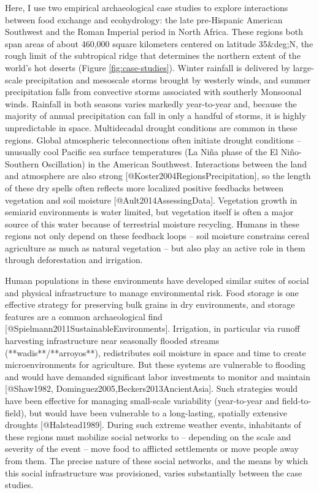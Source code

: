\documentclass[fleqn,10pt]{wlscirep}
\begin{document}
Here, I use two empirical archaeological case studies to explore interactions between food exchange and ecohydrology: the late pre-Hispanic American Southwest and the Roman Imperial period in North Africa. These regions both span areas of about 460,000 square kilometers centered on latitude 35&deg;N, the rough limit of the subtropical ridge that determines the northern extent of the world's hot deserts (Figure \ref{fig:case-studies}). Winter rainfall is delivered by large-scale precipitation and mesoscale storms brought by westerly winds, and summer precipitation falls from convective storms associated with southerly Monsoonal winds. Rainfall in both seasons varies markedly year-to-year and, because the majority of annual precipitation can fall in only a handful of storms, it is highly unpredictable in space. Multidecadal drought conditions are common in these regions. Global atmospheric teleconnections often initiate drought conditions -- unusually cool Pacific sea surface temperatures (La Ni\~{n}a phase of the El Ni\~{n}o-Southern Oscillation) in the American Southwest. Interactions between the land and atmosphere are also strong [@Koster2004RegionsPrecipitation], so the length of these dry spells often reflects more localized positive feedbacks between vegetation and soil moisture [@Ault2014AssessingData]. Vegetation growth in semiarid environments is water limited, but vegetation itself is often a major source of this  water because of terrestrial moisture recycling. Humans in these regions not only depend on these feedback loops -- soil moisture constrains cereal agriculture as much as natural vegetation -- but also play an active role in them through deforestation and irrigation.

Human populations in these environments have developed similar suites of social and physical infrastructure to manage environmental risk. Food storage is one effective strategy for preserving bulk grains in dry environments, and storage features are a common archaeological find [@Spielmann2011SustainableEnvironments]. Irrigation, in particular via runoff harvesting infrastructure near seasonally flooded streams (**wadis**/**arroyos**), redistributes soil moisture in space and time to create microenvironments for agriculture. But these systems are vulnerable to flooding and would have demanded significant labor investments to monitor and maintain [@Shaw1982, Dominguez2005,Beckers2013AncientAsia]. Such strategies would have been effective for managing small-scale variability (year-to-year and field-to-field), but would have been vulnerable to a long-lasting, spatially extensive droughts [@Halstead1989]. During such extreme weather events, inhabitants of these regions must mobilize social networks to -- depending on the scale and severity of the event -- move food to afflicted settlements or move people away from them. The precise nature of these social networks, and the means by which this social infrastructure was provisioned, varies substantially between the case studies.
\end{document}
